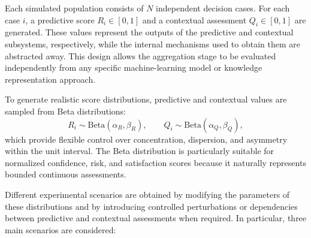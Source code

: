 \documentclass[mathematics,article,submit,moreauthors]{Definitions/mdpi}
\begin{document}
Each simulated population consists of $N$ independent decision cases.
For each case $i$, a predictive score $R_i\in[0,1]$ and a contextual
assessment $Q_i\in[0,1]$ are generated. These values represent the outputs
of the predictive and contextual subsystems, respectively, while the
internal mechanisms used to obtain them are abstracted away. This design
allows the aggregation stage to be evaluated independently from any
specific machine-learning model or knowledge representation approach.

To generate realistic score distributions, predictive and contextual
values are sampled from Beta distributions:
\begin{equation}
R_i\sim\mathrm{Beta}(\alpha_R,\beta_R),
\qquad
Q_i\sim\mathrm{Beta}(\alpha_Q,\beta_Q),
\end{equation}
which provide flexible control over concentration, dispersion, and
asymmetry within the unit interval. The Beta distribution is particularly
suitable for normalized confidence, risk, and satisfaction scores because
it naturally represents bounded continuous assessments.

Different experimental scenarios are obtained by modifying the parameters
of these distributions and by introducing controlled perturbations or
dependencies between predictive and contextual assessments when required.
In particular, three main scenarios are considered:
\end{document}
